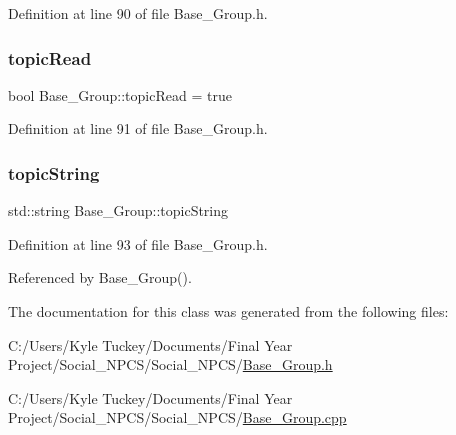 Definition at line 90 of file Base\+\_\+\+Group.\+h.

\mbox{\label{class_base___group_a48710d3a08af8433d94756b4980ebe65}} 
\subsubsection{\texorpdfstring{topic\+Read}{topicRead}}
{\footnotesize\ttfamily bool Base\+\_\+\+Group\+::topic\+Read = true\hspace{0.3cm}{\ttfamily [private]}}



Definition at line 91 of file Base\+\_\+\+Group.\+h.

\mbox{\label{class_base___group_a20e1ca90be1f271bf2256021d6325dfa}} 
\subsubsection{\texorpdfstring{topic\+String}{topicString}}
{\footnotesize\ttfamily std\+::string Base\+\_\+\+Group\+::topic\+String\hspace{0.3cm}{\ttfamily [private]}}



Definition at line 93 of file Base\+\_\+\+Group.\+h.



Referenced by Base\+\_\+\+Group().



The documentation for this class was generated from the following files\+:\begin{DoxyCompactItemize}
\item 
C\+:/\+Users/\+Kyle Tuckey/\+Documents/\+Final Year Project/\+Social\+\_\+\+N\+P\+C\+S/\+Social\+\_\+\+N\+P\+C\+S/\hyperlink{_base___group_8h}{Base\+\_\+\+Group.\+h}\item 
C\+:/\+Users/\+Kyle Tuckey/\+Documents/\+Final Year Project/\+Social\+\_\+\+N\+P\+C\+S/\+Social\+\_\+\+N\+P\+C\+S/\hyperlink{_base___group_8cpp}{Base\+\_\+\+Group.\+cpp}\end{DoxyCompactItemize}
